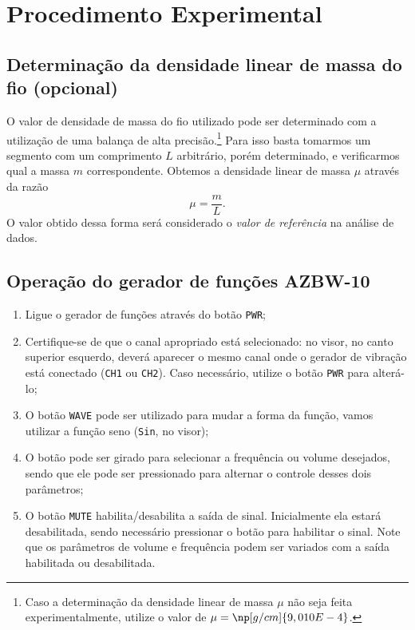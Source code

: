 \section{Procedimento Experimental}

\subsection{Determinação da densidade linear de massa do fio (opcional)}

O valor de densidade de massa do fio utilizado pode ser determinado com a utilização de uma balança de alta precisão.\footnote{Caso a determinação da densidade linear de massa $\mu$  não seja feita experimentalmente, utilize o valor de $\mu = \np[g/cm]{9,010E-4}$.} Para isso basta tomarmos um segmento com um comprimento $L$ arbitrário, porém determinado, e verificarmos qual a massa $m$ correspondente. Obtemos a densidade linear de massa $\mu$ através da razão
\begin{equation}
	\mu = \frac{m}{L}.
\end{equation}
%
O valor obtido dessa forma será considerado o \emph{valor de referência} na análise de dados.

\subsection{Operação do gerador de funções AZBW-10}

\begin{enumerate}
    \item Ligue o gerador de funções através do botão \texttt{PWR};
    \item Certifique-se de que o canal apropriado está selecionado: no visor, no canto superior esquerdo, deverá aparecer o mesmo canal onde o gerador de vibração está conectado (\texttt{CH1} ou \texttt{CH2}). Caso necessário, utilize o botão \texttt{PWR} para alterá-lo;
    \item O botão \texttt{WAVE} pode ser utilizado para mudar a forma da função, vamos utilizar a função seno (\texttt{Sin}, no visor);
    \item O botão  pode ser girado para selecionar a frequência ou volume desejados, sendo que ele pode ser pressionado para alternar o controle desses dois parâmetros;
    \item O botão \texttt{MUTE} habilita/desabilita a saída de sinal. Inicialmente ela estará desabilitada, sendo necessário pressionar o botão para habilitar o sinal. Note que os parâmetros de volume e frequência podem ser variados com a saída habilitada ou desabilitada.
\end{enumerate}

